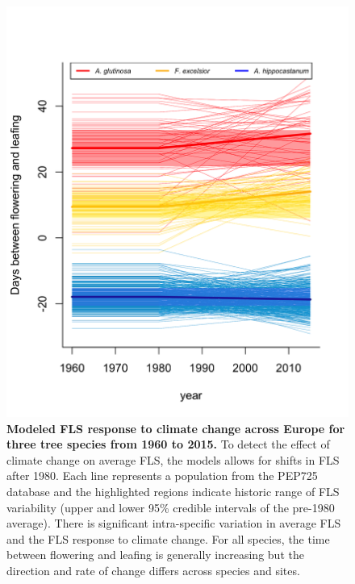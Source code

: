 \documentclass[12pt]{article}\usepackage[]{graphicx}\usepackage[]{color}
\begin{document}
\begin{figure}[ht]
    \centering
 \includegraphics[width=\textwidth]{..//figure/FLS_climate_change.png} 
    \caption{\textbf{Modeled FLS response to climate change across Europe for three tree species from 1960 to 2015.} To detect the effect of climate change on average FLS, the models allows for shifts in FLS after 1980. Each line represents a population from the PEP725 database and the highlighted regions indicate historic range of FLS variability (upper and lower 95\% credible intervals of the pre-1980 average). There is significant intra-specific variation in average FLS and the FLS response to climate change. For all species, the time between flowering and leafing is generally increasing but the direction and rate of change differs across species and sites.}
    \label{fig:Figure 1}
\end{figure}
\end{document}
